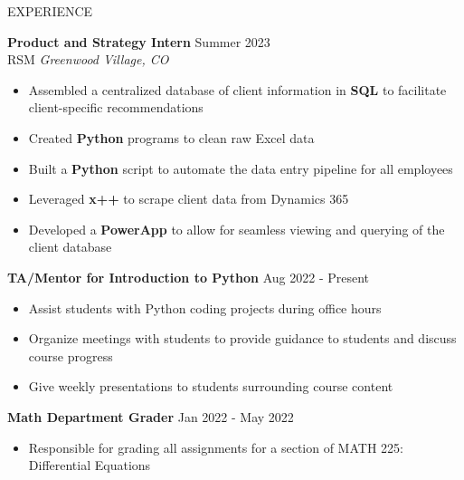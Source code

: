 \documentclass{resume} %
\begin{document}
\begin{rSection}{EXPERIENCE}

\textbf{Product and Strategy Intern} \hfill Summer 2023\\
RSM \hfill \textit{Greenwood Village, CO}
\vspace{-6pt}
 \begin{itemize}
    \itemsep -6pt {} 
     \item Assembled a centralized database of client information in \textbf{SQL} to facilitate client-specific recommendations 
     \item Created \textbf{Python} programs to clean raw Excel data
     \item Built a \textbf{Python} script to automate the data entry pipeline for all employees
     \item Leveraged \textbf{x++} to scrape client data from Dynamics 365
     \item Developed a \textbf{PowerApp} to allow for seamless viewing and querying of the client database
 \end{itemize}
 
\vspace{-4pt}

\textbf{TA/Mentor for Introduction to Python} \hfill Aug 2022 - Present%
\vspace{-6pt}
 \begin{itemize}
    \itemsep -6pt {} 
     \item Assist students with Python coding projects during office hours
     \item Organize meetings with students to provide guidance to students and discuss course progress
    \item Give weekly presentations to students surrounding course content
 \end{itemize}
 
\vspace{-4pt}

\textbf{Math Department Grader} \hfill Jan 2022 - May 2022%
\vspace{-6pt}
 \begin{itemize}
    \itemsep -6pt {} 
     \item Responsible for grading all assignments for a section of MATH 225: Differential Equations
 \end{itemize}

\end{rSection} 
\end{document}
